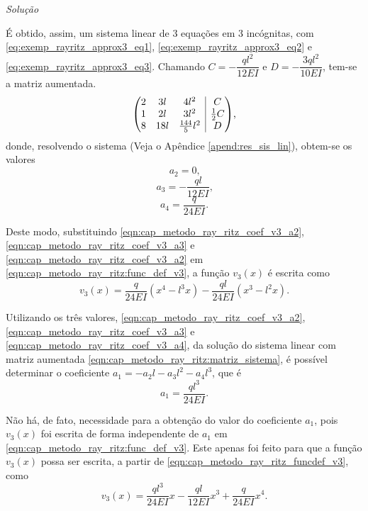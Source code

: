 \documentclass[
	12pt,				%
	openright,			%
    twoside,			%
	a4paper,			%
	english,			%
	french,				%
	spanish,			%
	brazil				%
	]{abntex2}
\makeatletter
\newenvironment{amatrix}[1]{%
  \left(\begin{array}{@{}*{#1}{c}|c@{}}
}{%
  \end{array}\right)
}
\renewenvironment{proof}[1][\proofname]{
	\par\pushQED{\qed}%
	\normalfont \topsep6\p@\@plus6\p@\relax
	\trivlist
	\item\relax
		{\itshape
			#1\@addpunct{.}}\hspace\labelsep\ignorespaces
}{%
	\popQED\endtrivlist\@endpefalse
}
\newenvironment{solution}{
	\begin{proof}[Solução]
}{%
	\end{proof}
}
\numberwithin{lema}{chapter}
\numberwithin{teorema}{chapter}
\numberwithin{definicao}{chapter}
\numberwithin{exemplo}{chapter}
\numberwithin{figure}{chapter}
\makeatother
\begin{document}
\begin{solution}
	É obtido, assim, um sistema linear de 3 equações em 3 incógnitas, com \eqref{eq:exemp_rayritz_approx3_eq1}, \eqref{eq:exemp_rayritz_approx3_eq2} e \eqref{eq:exemp_rayritz_approx3_eq3}. Chamando $C=-\dfrac{ql^2}{12EI}$ e $D=-\dfrac{3ql^2}{10EI}$, tem-se a matriz aumentada.
	\begin{equation}
		\label{eqn:cap_metodo_ray_ritz:matriz_sistema}
		\begin{amatrix}{3}
			2	& 	3l	&	4l^2 				& C \\
			1	& 	2l	&	3l^2			 	& \frac{1}{2}C \\
			8 	& 	18l & 	\frac{144}{5} l^2	& D
		\end{amatrix}
		\text{,}
	\end{equation}
	donde, resolvendo o sistema (Veja o Apêndice \ref{apend:res_sis_lin}), obtem-se os valores
	\begin{equation}
		\label{eqn:cap_metodo_ray_ritz_coef_v3_a2}
		a_2=0\text{,}
	\end{equation}
	\begin{equation}
		\label{eqn:cap_metodo_ray_ritz_coef_v3_a3}
		a_3=-\frac{ql}{12EI}\text{,}
	\end{equation}
	\begin{equation}
		\label{eqn:cap_metodo_ray_ritz_coef_v3_a4}
		a_4=\frac{q}{24EI}\text{.}
	\end{equation}
		
	Deste modo, substituindo \eqref{eqn:cap_metodo_ray_ritz_coef_v3_a2}, \eqref{eqn:cap_metodo_ray_ritz_coef_v3_a3} e \eqref{eqn:cap_metodo_ray_ritz_coef_v3_a2} em \eqref{eqn:cap_metodo_ray_ritz:func_def_v3}, a função $v_3(x)$ é escrita como
	\begin{equation}
		\label{eqn:cap_metodo_ray_ritz:func_v3}
		v_3(x) =
		\frac{q}{24EI} ( x^4 - l^3 x )
		-
		\frac{ql}{24EI} ( x^3 - l^2 x )
		\text{.}
	\end{equation}
	
	Utilizando os três valores, \eqref{eqn:cap_metodo_ray_ritz_coef_v3_a2}, \eqref{eqn:cap_metodo_ray_ritz_coef_v3_a3} e \eqref{eqn:cap_metodo_ray_ritz_coef_v3_a4}, da solução do sistema linear com matriz aumentada \eqref{eqn:cap_metodo_ray_ritz:matriz_sistema}, é possível determinar o coeficiente $a_1=-a_2l-a_3l^2-a_4l^3$, que é
	\begin{equation}
		\label{eqn:cap_metodo_ray_ritz_coef_v3_a1}
		a_1 = \frac{ql^3}{24EI}
		\text{.}
	\end{equation}	
	
	Não há, de fato, necessidade para a obtenção do valor do coeficiente $a_1$, pois $v_3(x)$ foi escrita de forma independente de $a_1$ em \eqref{eqn:cap_metodo_ray_ritz:func_def_v3}. Este apenas foi feito para que a função $v_3(x)$ possa ser escrita, a partir de \eqref{eqn:cap_metodo_ray_ritz_funcdef_v3}, como
	\begin{equation}
		\label{eqn:cap_metodo_ray_ritz:func_v3_forma2}
		v_3(x)=
			\frac{ql^3}{24EI} x
			-
			\frac{ql}{12EI} x^3
			+
			\frac{q}{24EI} x^4
		\text{.}
	\end{equation}



\end{solution}
\end{document}
